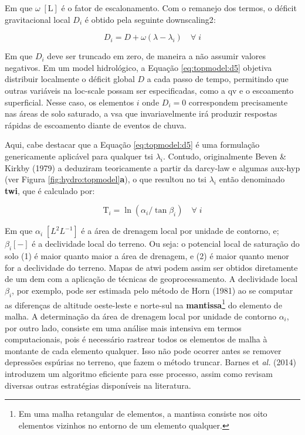 \documentclass[./main.tex]{subfiles}
\begin{document}
Em que $\omega \; [\text{L}]$ é o fator de escalonamento. Com o remanejo dos termos, o déficit gravitacional local $D_{i}$ é obtido pela seguinte \gls{downscaling2}:
\begin{linenomath*}
\begin{equation}
\label{eq:topmodel:d5}
D_{i}  = D + \omega (\lambda - \lambda_{i}) \quad \forall \; i
\end{equation}
\end{linenomath*}
Em que $D_i$ deve ser truncado em zero, de maneira a não assumir valores negativos. Em um \gls{model} hidrológico, a Equação \eqref{eq:topmodel:d5} objetiva distribuir localmente o déficit global $D$ a cada passo de tempo, permitindo que outras variáveis na \gls{loc-scale} possam ser especificadas, como a \gls{qv} e o escoamento superficial. Nesse caso, os elementos $i$ onde $D_i = 0$ correspondem precisamente nas áreas de solo saturado, a \gls{vsa} que invariavelmente irá produzir respostas rápidas de escoamento diante de eventos de chuva. 

\par Aqui, cabe destacar que a Equação \eqref{eq:topmodel:d5} é uma formulação genericamente aplicável para qualquer \gls{tsi} $\lambda_{i}$. Contudo, originalmente Beven \& Kirkby (1979) a deduziram teoricamente a partir da \gls{darcy-law} e algumas \gls{aux-hyp} (ver Figura \ref{fig:hydro:topmodel}\textbf{a}), o que resultou no \gls{tsi} $\lambda_{i}$ então denominado \textbf{\gls{twi}}, que é calculado por:
\begin{linenomath*}
\begin{equation}
\label{eq:topmodel:twi}
\text{T}_{i}  = \ln{(\alpha_{i}/\tan \beta_{i})} \quad \forall \; i
\end{equation}
\end{linenomath*}
Em que $\alpha_{i}\; [L^{2}L^{-1}]$ é a área de drenagem local por unidade de contorno, e;  $\beta_{i} [-]$ é a declividade local do terreno. Ou seja: o potencial local de saturação do solo (1)  é maior quanto maior a área de drenagem, e (2) é maior quanto menor for a declividade do terreno. Mapas de \acrshort{atwi} podem assim ser obtidos diretamente de um \acrfull{dem} com a aplicação de técnicas de geoprocessamento. A declividade local $\beta_{i}$, por exemplo, pode ser estimada pelo método de Horn (1981) \cite{Horn1981a} ao se computar as diferenças de altitude oeste-leste e norte-sul na \textbf{mantissa}\footnote{Em uma malha retangular de elementos, a mantissa consiste nos oito elementos vizinhos no entorno de um elemento qualquer.} do elemento de malha. A determinação da área de drenagem local por unidade de contorno $\alpha_{i}$, por outro lado, consiste em uma análise mais intensiva em termos computacionais, pois é necessário rastrear todos os elementos de malha à montante de cada elemento qualquer. Isso não pode ocorrer antes se remover depressões espúrias no terreno, que fazem o método truncar. Barnes et \textit{al.} (2014) \cite{Barnes2014a} introduzem um algoritmo eficiente para esse processo, assim como revisam diversas outras estratégias disponíveis na literatura. 
\end{document}
